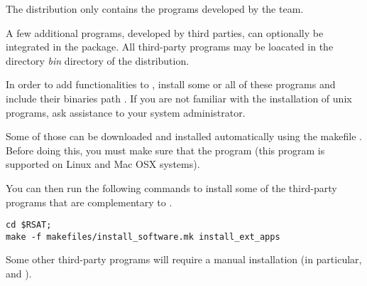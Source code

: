 \documentclass[12pt,a4paper, oneside]{scrreprt} %
\begin{document}
The \RSAT distribution only contains the programs developed by the
\RSAT team.

A few additional programs, developed by third parties, can optionally
be integrated in the package. All third-party programs may be loacated
in the directory \emph{bin} directory of the \RSAT distribution.  

In order to add functionalities to \RSAT, install some or all of these
programs and include their binaries path . If you are
not familiar with the installation of unix programs, ask assistance to
your system administrator.

Some of those can be downloaded and installed automatically using the
makefile . Before doing this, you must make
sure that the program  (this program is supported on
Linux  and Mac OSX
systems).

You can then run the following commands to install some of the
third-party programs that are complementary to \RSAT.

\begin{lstlisting}
cd $RSAT;
make -f makefiles/install_software.mk install_ext_apps
\end{lstlisting}

Some other third-party programs will require a manual installation (in
particular,  and ).
\end{document}
